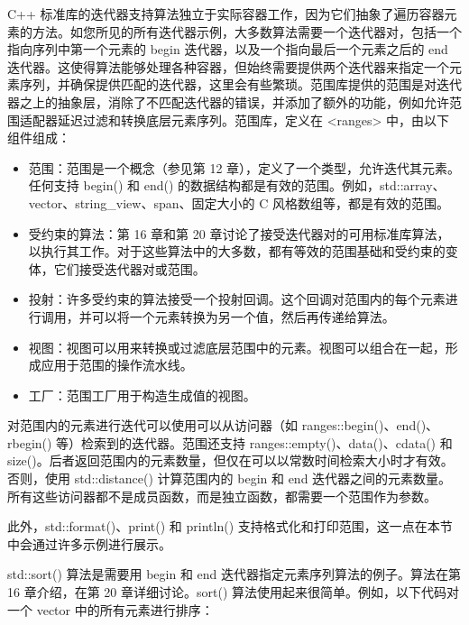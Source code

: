 

C++ 标准库的迭代器支持算法独立于实际容器工作，因为它们抽象了遍历容器元素的方法。如您所见的所有迭代器示例，大多数算法需要一个迭代器对，包括一个指向序列中第一个元素的 begin 迭代器，以及一个指向最后一个元素之后的 end 迭代器。这使得算法能够处理各种容器，但始终需要提供两个迭代器来指定一个元素序列，并确保提供匹配的迭代器，这里会有些繁琐。范围库提供的范围是对迭代器之上的抽象层，消除了不匹配迭代器的错误，并添加了额外的功能，例如允许范围适配器延迟过滤和转换底层元素序列。范围库，定义在 <ranges> 中，由以下组件组成：

\begin{itemize}
\item
范围：范围是一个概念（参见第 12 章），定义了一个类型，允许迭代其元素。任何支持 begin() 和 end() 的数据结构都是有效的范围。例如，std::array、vector、string\_view、span、固定大小的 C 风格数组等，都是有效的范围。

\item
受约束的算法：第 16 章和第 20 章讨论了接受迭代器对的可用标准库算法，以执行其工作。对于这些算法中的大多数，都有等效的范围基础和受约束的变体，它们接受迭代器对或范围。

\item
投射：许多受约束的算法接受一个投射回调。这个回调对范围内的每个元素进行调用，并可以将一个元素转换为另一个值，然后再传递给算法。

\item
视图：视图可以用来转换或过滤底层范围中的元素。视图可以组合在一起，形成应用于范围的操作流水线。

\item
工厂：范围工厂用于构造生成值的视图。
\end{itemize}

对范围内的元素进行迭代可以使用可以从访问器（如 ranges::begin()、end()、rbegin() 等）检索到的迭代器。范围还支持 ranges::empty()、data()、cdata() 和 size()。后者返回范围内的元素数量，但仅在可以以常数时间检索大小时才有效。否则，使用 std::distance() 计算范围内的 begin 和 end 迭代器之间的元素数量。所有这些访问器都不是成员函数，而是独立函数，都需要一个范围作为参数。

此外，std::format()、print() 和 println() 支持格式化和打印范围，这一点在本节中会通过许多示例进行展示。


std::sort() 算法是需要用 begin 和 end 迭代器指定元素序列算法的例子。算法在第 16 章介绍，在第 20 章详细讨论。sort() 算法使用起来很简单。例如，以下代码对一个 vector 中的所有元素进行排序：

